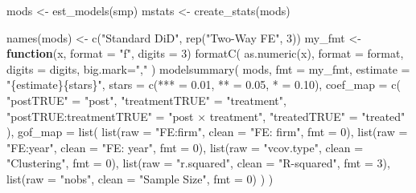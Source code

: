 \documentclass[
  letterpaper,
  DIV=11,
  numbers=noendperiod]{scrartcl}
\newenvironment{Shaded}{\begin{snugshade}}{\end{snugshade}}
\newcommand{\AttributeTok}[1]{\textcolor[rgb]{0.40,0.45,0.13}{#1}}
\newcommand{\ControlFlowTok}[1]{\textcolor[rgb]{0.00,0.23,0.31}{\textbf{#1}}}
\newcommand{\DecValTok}[1]{\textcolor[rgb]{0.68,0.00,0.00}{#1}}
\newcommand{\FloatTok}[1]{\textcolor[rgb]{0.68,0.00,0.00}{#1}}
\newcommand{\FunctionTok}[1]{\textcolor[rgb]{0.28,0.35,0.67}{#1}}
\newcommand{\NormalTok}[1]{\textcolor[rgb]{0.00,0.23,0.31}{#1}}
\newcommand{\OtherTok}[1]{\textcolor[rgb]{0.00,0.23,0.31}{#1}}
\newcommand{\StringTok}[1]{\textcolor[rgb]{0.13,0.47,0.30}{#1}}
\begin{document}
\begin{Shaded}
\begin{Highlighting}[]
\NormalTok{mods }\OtherTok{\textless{}{-}} \FunctionTok{est\_models}\NormalTok{(smp)}
\NormalTok{mstats }\OtherTok{\textless{}{-}} \FunctionTok{create\_stats}\NormalTok{(mods)}

\FunctionTok{names}\NormalTok{(mods) }\OtherTok{\textless{}{-}} \FunctionTok{c}\NormalTok{(}\StringTok{"Standard DiD"}\NormalTok{, }\FunctionTok{rep}\NormalTok{(}\StringTok{"Two{-}Way FE"}\NormalTok{, }\DecValTok{3}\NormalTok{))}
\NormalTok{my\_fmt }\OtherTok{\textless{}{-}} \ControlFlowTok{function}\NormalTok{(x, }\AttributeTok{format =} \StringTok{"f"}\NormalTok{, }\AttributeTok{digits =} \DecValTok{3}\NormalTok{) }\FunctionTok{formatC}\NormalTok{(}
    \FunctionTok{as.numeric}\NormalTok{(x), }\AttributeTok{format =}\NormalTok{ format, }\AttributeTok{digits =}\NormalTok{ digits, }\AttributeTok{big.mark=}\StringTok{","}
\NormalTok{)}
\FunctionTok{modelsummary}\NormalTok{(}
\NormalTok{    mods,}
    \AttributeTok{fmt =}\NormalTok{ my\_fmt, }
    \AttributeTok{estimate =} \StringTok{"\{estimate\}\{stars\}"}\NormalTok{,}
    \AttributeTok{stars =} \FunctionTok{c}\NormalTok{(}\StringTok{\textasciigrave{}}\AttributeTok{***}\StringTok{\textasciigrave{}} \OtherTok{=} \FloatTok{0.01}\NormalTok{, }\StringTok{\textasciigrave{}}\AttributeTok{**}\StringTok{\textasciigrave{}} \OtherTok{=} \FloatTok{0.05}\NormalTok{, }\StringTok{\textasciigrave{}}\AttributeTok{*}\StringTok{\textasciigrave{}} \OtherTok{=} \FloatTok{0.10}\NormalTok{),}
    \AttributeTok{coef\_map =} \FunctionTok{c}\NormalTok{(}
        \StringTok{"postTRUE"} \OtherTok{=} \StringTok{"post"}\NormalTok{,}
        \StringTok{"treatmentTRUE"} \OtherTok{=} \StringTok{"treatment"}\NormalTok{, }
        \StringTok{"postTRUE:treatmentTRUE"} \OtherTok{=} \StringTok{"post × treatment"}\NormalTok{, }
        \StringTok{"treatedTRUE"} \OtherTok{=} \StringTok{"treated"}
\NormalTok{    ),}
    \AttributeTok{gof\_map =} \FunctionTok{list}\NormalTok{(}
        \FunctionTok{list}\NormalTok{(}\AttributeTok{raw =} \StringTok{"FE:firm"}\NormalTok{, }\AttributeTok{clean =} \StringTok{"FE: firm"}\NormalTok{, }\AttributeTok{fmt =} \DecValTok{0}\NormalTok{),}
        \FunctionTok{list}\NormalTok{(}\AttributeTok{raw =} \StringTok{"FE:year"}\NormalTok{, }\AttributeTok{clean =} \StringTok{"FE: year"}\NormalTok{, }\AttributeTok{fmt =} \DecValTok{0}\NormalTok{),}
        \FunctionTok{list}\NormalTok{(}\AttributeTok{raw =} \StringTok{"vcov.type"}\NormalTok{, }\AttributeTok{clean =} \StringTok{"Clustering"}\NormalTok{, }\AttributeTok{fmt =} \DecValTok{0}\NormalTok{),}
        \FunctionTok{list}\NormalTok{(}\AttributeTok{raw =} \StringTok{"r.squared"}\NormalTok{, }\AttributeTok{clean =} \StringTok{"R{-}squared"}\NormalTok{, }\AttributeTok{fmt =} \DecValTok{3}\NormalTok{),}
        \FunctionTok{list}\NormalTok{(}\AttributeTok{raw =} \StringTok{"nobs"}\NormalTok{, }\AttributeTok{clean =} \StringTok{"Sample Size"}\NormalTok{, }\AttributeTok{fmt =} \DecValTok{0}\NormalTok{)}
\NormalTok{    )}
\NormalTok{)}
\end{Highlighting}
\end{Shaded}
\end{document}
